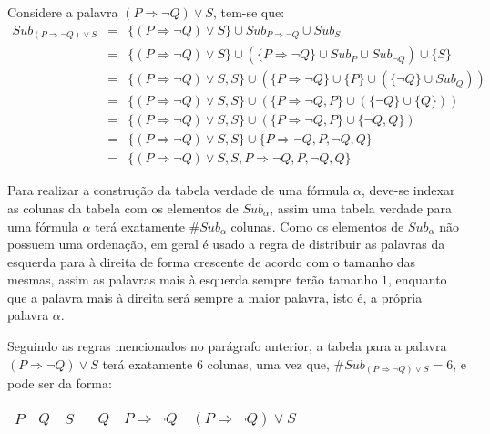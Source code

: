 \begin{exemplo}
  Considere a palavra $(P \Rightarrow \neg Q) \lor S$, tem-se que:
  \begin{eqnarray*}
    Sub_{(P \Rightarrow \neg Q) \lor S} & = & \{(P \Rightarrow \neg Q) \lor S\} \cup Sub_{P \Rightarrow \neg Q} \cup Sub_S\\
    & = & \{(P \Rightarrow \neg Q) \lor S\} \cup (\{P \Rightarrow \neg Q\} \cup Sub_{P} \cup Sub_{\neg Q}) \cup \{S\}\\
    & = & \{(P \Rightarrow \neg Q) \lor S, S\} \cup (\{P \Rightarrow \neg Q\} \cup \{P\} \cup (\{\neg Q\} \cup Sub_{Q}))\\
    & = & \{(P \Rightarrow \neg Q) \lor S, S\} \cup (\{P \Rightarrow \neg Q, P\} \cup (\{\neg Q\} \cup \{Q\}))\\
    & = & \{(P \Rightarrow \neg Q) \lor S, S\} \cup (\{P \Rightarrow \neg Q, P\} \cup \{\neg Q, Q\})\\
    & = & \{(P \Rightarrow \neg Q) \lor S, S\} \cup \{P \Rightarrow \neg Q, P, \neg Q, Q\}\\
    & = & \{(P \Rightarrow \neg Q) \lor S, S, P \Rightarrow \neg Q, P, \neg Q, Q\}
  \end{eqnarray*}
\end{exemplo}

Para realizar a construção da tabela verdade de uma fórmula $\alpha$, deve-se indexar as colunas da tabela com os elementos de $Sub_\alpha$, assim uma tabela verdade para uma fórmula $\alpha$ terá exatamente $\# Sub_\alpha$ colunas. Como os elementos de $Sub_\alpha$ não possuem uma ordenação, em geral é usado a regra de distribuir as palavras da esquerda para à direita de forma crescente de acordo com o tamanho das mesmas, assim as palavras mais à esquerda sempre terão tamanho $1$, enquanto que a palavra mais à direita será sempre a maior palavra, isto é, a própria palavra $\alpha$. 

\begin{exemplo}
  Seguindo as regras mencionados no parágrafo anterior, a tabela para a palavra $(P \Rightarrow \neg Q) \lor S$ terá exatamente $6$ colunas, uma vez que, $\# Sub_{(P \Rightarrow \neg Q) \lor S} = 6$, e pode ser da forma: 

  \begin{table}[H]
    \centering
    \begin{tabular}{|c|c|c|c|c|c|}
      \hline
      $P$ & $Q$ & $S$ & $\neg Q$ & $P \Rightarrow \neg Q$ & $(P \Rightarrow \neg Q) \lor S$\\
      \hline
    \end{tabular}
  \end{table} 
\end{exemplo}



